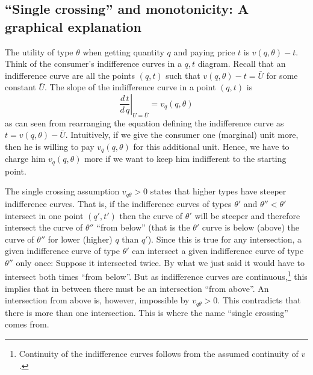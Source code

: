 \documentclass[12pt]{article}
\begin{document}
\subsection{ ``Single crossing'' and monotonicity: A graphical explanation}

The utility of type $\theta $ when getting quantity $q$ and paying price $t$ is $v(q,\theta )-t$. Think of the consumer's indifference curves in a $q,t$ diagram. Recall that an indifference curve are all the points $(q,t)$ such that $v(q,\theta )-t=\bar{U}$ for some constant $\bar{U}$. The slope of the indifference curve in a point $(q,t)$ is 
\begin{equation*}
  \left.\frac{d\,t}{d\,q}\right|_{U=\bar{U}}=v_q(q,\theta )
\end{equation*}
as can seen from rearranging the equation defining the indifference curve as $t=v(q,\theta )-\bar{U}$.
Intuitively, if we give the consumer one (marginal) unit more, then he is willing to pay $v_q(q,\theta )$ for this additional unit. Hence, we have to charge him $v_q(q,\theta )$ more if we want to keep him indifferent to the starting point.

The single crossing assumption $v_{q\theta }>0$ states that higher types have steeper indifference curves. That is, if the indifference curves of types $\theta '$ and $\theta ''<\theta '$ intersect in one point $(q',t')$ then the curve of $\theta '$ will be steeper and therefore intersect the curve of $\theta ''$ ``from below'' (that is the $\theta '$ curve is below (above) the curve of $\theta ''$ for lower (higher) $q$ than $q'$). Since this is true for any intersection, a given indifference curve of type $\theta '$ can intersect a given indifference curve of type $\theta ''$ only once: Suppose it intersected twice. By what we just said it would have to  intersect both times ``from below''. But as indifference curves are continuous,\footnote{Continuity of the indifference curves follows from the assumed continuity of $v$.} this implies that in between there must be an intersection ``from above''. An intersection from above is, however, impossible by $v_{q\theta }>0$. This contradicts that there is more than one intersection. This is where the name ``single crossing'' comes from.
\end{document}
